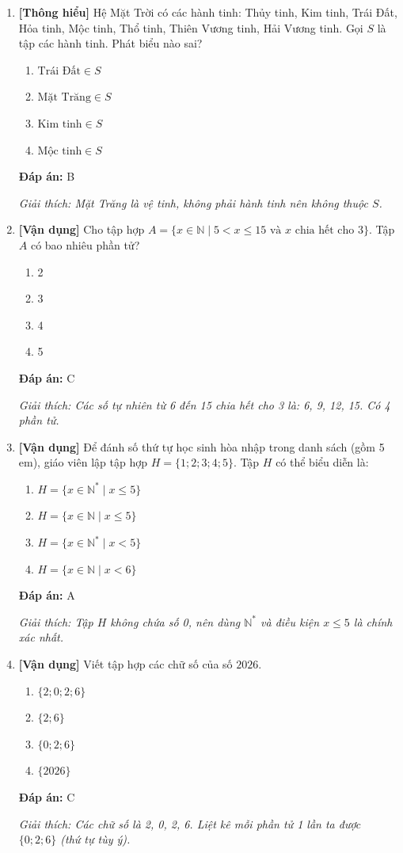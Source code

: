 \documentclass[12pt,a4paper]{article}
\newcommand{\thonghieu}{\textcolor{thonghieu}{\textbf{[Thông hiểu]}}}
\newcommand{\vandung}{\textcolor{vandung}{\textbf{[Vận dụng]}}}
\newcommand{\dapan}[1]{\par\smallskip\textbf{Đáp án:} #1}
\newcommand{\giaithich}[1]{\par\textit{Giải thích: #1}}
\begin{document}
\begin{enumerate}[label=\textbf{Câu \arabic*.}]
    \item \thonghieu{} Hệ Mặt Trời có các hành tinh: Thủy tinh, Kim tinh, Trái Đất, Hỏa tinh, Mộc tinh, Thổ tinh, Thiên Vương tinh, Hải Vương tinh. Gọi $S$ là tập các hành tinh. Phát biểu nào sai?
    \begin{enumerate}[label=\Alph*.]
        \item $\text{Trái Đất} \in S$
        \item $\text{Mặt Trăng} \in S$
        \item $\text{Kim tinh} \in S$
        \item $\text{Mộc tinh} \in S$
    \end{enumerate}
    \dapan{B}
    \giaithich{Mặt Trăng là vệ tinh, không phải hành tinh nên không thuộc $S$.}

    \item \vandung{} Cho tập hợp $A = \{x \in \mathbb{N} \mid 5 < x \le 15 \text{ và } x \text{ chia hết cho } 3\}$. Tập $A$ có bao nhiêu phần tử?
    \begin{enumerate}[label=\Alph*.]
        \item 2
        \item 3
        \item 4
        \item 5
    \end{enumerate}
    \dapan{C}
    \giaithich{Các số tự nhiên từ 6 đến 15 chia hết cho 3 là: 6, 9, 12, 15. Có 4 phần tử.}

    \item \vandung{} Để đánh số thứ tự học sinh hòa nhập trong danh sách (gồm 5 em), giáo viên lập tập hợp $H = \{1; 2; 3; 4; 5\}$. Tập $H$ có thể biểu diễn là:
    \begin{enumerate}[label=\Alph*.]
        \item $H = \{x \in \mathbb{N}^* \mid x \le 5\}$
        \item $H = \{x \in \mathbb{N} \mid x \le 5\}$
        \item $H = \{x \in \mathbb{N}^* \mid x < 5\}$
        \item $H = \{x \in \mathbb{N} \mid x < 6\}$
    \end{enumerate}
    \dapan{A}
    \giaithich{Tập $H$ không chứa số 0, nên dùng $\mathbb{N}^*$ và điều kiện $x \le 5$ là chính xác nhất.}

    \item \vandung{} Viết tập hợp các chữ số của số $2026$.
    \begin{enumerate}[label=\Alph*.]
        \item $\{2; 0; 2; 6\}$
        \item $\{2; 6\}$
        \item $\{0; 2; 6\}$
        \item $\{2026\}$
    \end{enumerate}
    \dapan{C}
    \giaithich{Các chữ số là 2, 0, 2, 6. Liệt kê mỗi phần tử 1 lần ta được $\{0; 2; 6\}$ (thứ tự tùy ý).}
\end{enumerate}
\end{document}
